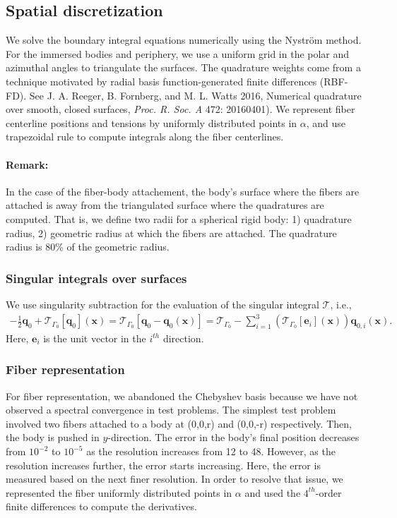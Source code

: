 \documentclass{article}
\newcommand{\xx}{\mathbf{x}}
\newcommand{\qq}{\mathbf{q}}
\newcommand{\ee}{\mathbf{e}}
\newcommand{\calT}{\mathcal{T}}
\begin{document}
\subsection{Spatial discretization}
We solve the boundary integral equations numerically using the Nystr\"{o}m method. For the immersed bodies and periphery, we use a uniform grid in the polar and azimuthal angles to triangulate the surfaces. The quadrature weights come from a technique motivated by radial basis function-generated finite differences (RBF-FD). See J. A. Reeger, B. Fornberg, and M. L. Watts 2016, Numerical quadrature over smooth, closed surfaces, \textit{Proc. R. Soc. A} 472: 20160401). We represent fiber centerline positions and tensions by uniformly distributed points in $\alpha$, and use trapezoidal rule to compute integrals along the fiber centerlines.

\paragraph*{Remark:} In the case of the fiber-body attachement, the body's surface where the fibers are attached is away from the triangulated surface where the quadratures are computed. That is, we define two radii for a spherical rigid body: 1) quadrature radius, 2) geometric radius at which the fibers are attached. The quadrature radius is 80\% of the geometric radius.



\subsubsection{Singular integrals over surfaces}
We use singularity subtraction for the evaluation of the singular integral $\calT$, i.e.,
\begin{align}
    -\frac{1}{2}\qq_0 + \calT_{\Gamma_0}[\qq_0](\xx) = \calT_{\Gamma_0}[\qq_0 - \qq_0(\xx)] = \calT_{\Gamma_0} - \sum_{i=1}^3 \left(\calT_{\Gamma_0}[\ee_i](\xx)\right)\qq_{0,i}(\xx).
\end{align}
Here, $\ee_i$ is the unit vector in the $i^{th}$ direction.


\subsubsection{Fiber representation}
For fiber representation, we abandoned the Chebyshev basis because we have not observed a spectral convergence in test problems. The simplest test problem involved two fibers attached to a body at (0,0,r) and (0,0,-r) respectively. Then, the body is pushed in $y$-direction. The error in the body's final position decreases from $10^{-2}$ to $10^{-5}$ as the resolution increases from 12 to 48. However, as the resolution increases further, the error starts increasing. Here, the error is measured based on the next finer resolution. In order to resolve that issue, we represented the fiber uniformly distributed points in $\alpha$ and used the $4^{th}$-order finite differences to compute the derivatives.
\end{document}
